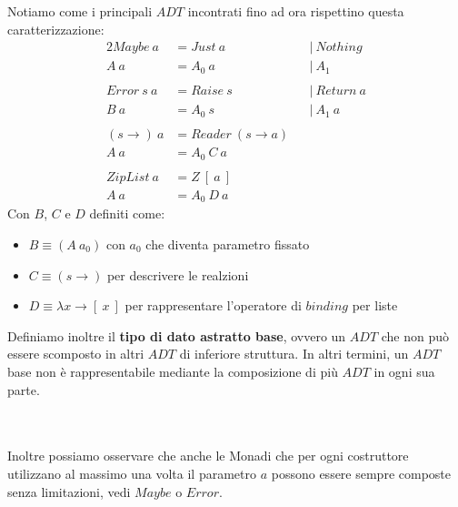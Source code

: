 Notiamo come i principali $ADT$ incontrati fino ad ora rispettino questa caratterizzazione:
\begin{alignat*}{2}
  Maybe\ a &= Just\ a\ &&|\ Nothing\\
  A\ a &= A_0\ a\ &&|\ A_1 \\\\
  Error\ s\ a &= Raise\ s\ &&|\ Return\ a\\
  B\ a &= A_0\ s\ &&|\ A_1\ a\\\\
  (s \to)\ a &= Reader\ (s \to a)\\
  A\ a &= A_0\ C\ a\\\\
  ZipList\ a &= Z\ [\ a\ ]\\
  A\ a &= A_0\ D\ a
\end{alignat*}
Con $B$, $C$ e $D$ definiti come:
\begin{itemize}
  \item $B \equiv (A\ a_0)$ con $a_0$ che diventa parametro fissato
  \item $C \equiv (s \to)$ per descrivere le realzioni
  \item $D \equiv \lambda x \to [\ x\ ]$ per rappresentare l'operatore di $binding$ per liste
\end{itemize}

Definiamo inoltre il \textbf{tipo di dato astratto base}, ovvero un $ADT$ che non può essere
scomposto in altri $ADT$ di inferiore struttura.
In altri termini, un $ADT$ base non è rappresentabile mediante la composizione di
più $ADT$ in ogni sua parte.\newline

\setlength{\fboxsep}{1em}
\\\\
Inoltre possiamo osservare che anche le Monadi che per ogni costruttore utilizzano
al massimo una volta il parametro $a$ possono essere sempre composte senza limitazioni,
vedi $Maybe$ o $Error$.

